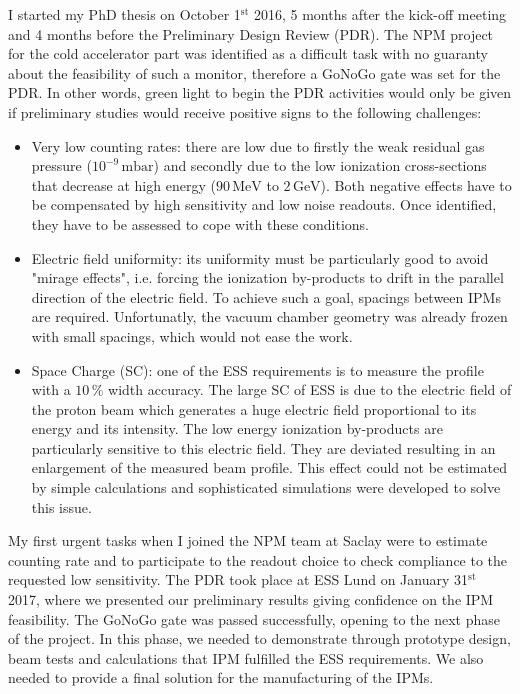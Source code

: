 I started my PhD thesis on October 1$\mathrm{^{st}}$ 2016, 5 months after the kick-off meeting and 4 months before the Preliminary Design Review (PDR). The NPM project for the cold accelerator part was identified as a difficult task with no guaranty about the feasibility of such a monitor, therefore a GoNoGo gate was set for the PDR. In other words, green light to begin the PDR activities would only be given if preliminary studies would receive positive signs to the following challenges:
\begin{itemize}
  \item Very low counting rates: there are low due to firstly the weak residual gas pressure ($10^{-9}\,\mathrm{mbar}$) and secondly due to the low ionization cross-sections that decrease at high energy ($90\,\mathrm{MeV}$ to $2\,\mathrm{GeV}$). Both negative effects have to be compensated by high sensitivity and low noise readouts. Once identified, they have to be assessed to cope with these conditions.
  \item Electric field uniformity: its uniformity must be particularly good to avoid "mirage effects", i.e. forcing the ionization by-products to drift in the parallel direction of the electric field. To achieve such a goal, spacings between IPMs are required. Unfortunatly, the vacuum chamber geometry was already frozen with small spacings, which would not ease the work.
  \item Space Charge (SC): one of the ESS requirements is to measure the profile with a $10\,\%$ width accuracy. The large SC of ESS is due to the electric field of the proton beam which generates a huge electric field proportional to its energy and its intensity. The low energy ionization by-products are particularly sensitive to this electric field. They are deviated resulting in an enlargement of the measured beam profile. This effect could not be estimated by simple calculations and sophisticated simulations were developed to solve this issue.
\end{itemize}

My first urgent tasks when I joined the NPM team at Saclay were to estimate counting rate and to participate to the readout choice to check compliance to the requested low sensitivity. The PDR took place at ESS Lund on January 31$\mathrm{^{st}}$ 2017, where we presented our preliminary results giving confidence on the IPM feasibility. The GoNoGo gate was passed successfully, opening to the next phase of the project. In this phase, we needed to demonstrate through prototype design, beam tests and calculations that IPM fulfilled the ESS requirements. We also needed to provide a final solution for the manufacturing of the IPMs.

